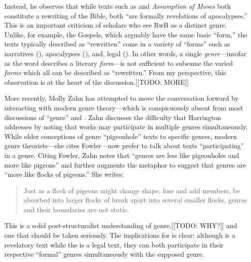  Instead, he observes that while texts such as \jub and \emph{Assumption of Moses} both constitute a rewriting of the Bible, both ``are formally revelations of apocalypses.''\autocite[243]{harrington_kraft-nickelsburg1986} This is an important criticism of scholars who see RwB as a distinct genre. Unlike, for example, the Gospels, which arguably have the same basic ``form,'' the texts typically described as ``rewritten'' come in a variety of ``forms'' such as narratives (\ga), apocalypses (\jub), and, legal (\templescroll). In other words, a single \emph{genre}---insofar as the word describes a literary \emph{form}---is not sufficient to subsume the varied \emph{forms} which all can be described as ``rewritten.'' From my perspective, this observation is at the heart of the discussion.[[TODO: MORE]] 

 More recently, Molly Zahn has attempted to move the conversation forward by interacting with modern genre theory---which is conspicuously absent from most discussions of ``genre'' and \rwb.\autocites{zahn_jbl2012}[Daniel Machiela noted the absence of genre theory in his 2010 article, as well, see][]{machiela_jjs2010}[Notable exceptions include][]{brooke_dsd2010} Zahn discusses the difficulty that Harrington addresses by noting that works may participate in multiple genres simultaneously. While older conceptions of genre ``pigeonhole'' texts to specific genres, modern genre theorists---she cites Fowler---now prefer to talk about texts ``participating'' in a genre. Citing Fowler, Zahn notes that ``genres are less like pigeonholes and more like pigeons'' and further augments the metaphor to suggest that genres are ``more like flocks of pigeons.'' She writes: 

 \begin{quote} Just as a flock of pigeons might change shape, lose and add members, be absorbed into larger flocks of break apart into several smaller flocks, genres and their boundaries are not static.\autocite[277]{zahn_jbl2012} \end{quote} 

 This is a solid post-structuralist understanding of genre,[[TODO: WHY?]] and one that should be taken seriously. The implications for \rwb is clear: although \jub is a revelatory text while the \templescroll is a legal text, they can both participate in their respective ``formal'' genres simultaneously with the supposed \rwb genre.\autocites[Zahn also explores the ``functional'' aspects of genre. She notes that genres are ``not simply systems of classifications developed and used by literary critics, but are fundamental to all human communication.''][280]{zahn_jbl2012}[Thus, genres manifest as common patterns recognized by both the author and the reader which aid communication and in this way, genre functions as a sort of ``literary body language.''][276]{zahn_jbl2012}[See also][199: TODO: ADD FOWLER]{newsom_grossman2010} 

